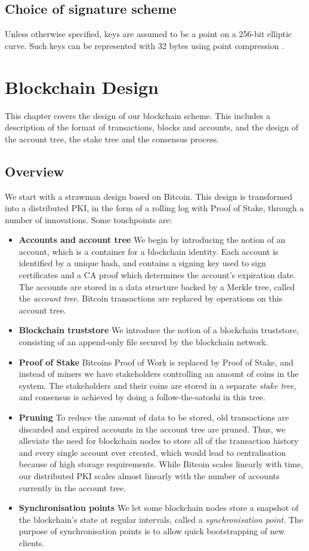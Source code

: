 \documentclass{style/kththesis}
\begin{document}
\section{Choice of signature scheme}
Unless otherwise specified, keys are assumed to be a point on a 256-bit elliptic curve. Such keys can be represented with 32 bytes using point compression \cite{Jivsov14}.

\chapter{Blockchain Design}
\label{chap:blockchain}
This chapter covers the design of our blockchain scheme. This includes a description of the format of transactions, blocks and accounts, and the design of the account tree, the stake tree and the consensus process.

\section{Overview}
We start with a strawman design based on Bitcoin. This design is transformed into a distributed PKI, in the form of a rolling log with Proof of Stake, through a number of innovations. Some touchpoints are:

\begin{itemize}
    \item \textbf{Accounts and account tree} We begin by introducing the notion of an account, which is a container for a blockchain identity. Each account is identified by a unique hash, and contains a signing key used to sign certificates and a CA proof which determines the account's expiration date. The accounts are stored in a data structure backed by a Merkle tree, called the \emph{account tree}. Bitcoin transactions are replaced by operations on this account tree.
    \item \textbf{Blockchain truststore} We introduce the notion of a blockchain truststore, consisting of an append-only file secured by the blockchain network.
    \item \textbf{Proof of Stake} Bitcoins Proof of Work is replaced by Proof of Stake, and instead of miners we have stakeholders controlling an amount of coins in the system. The stakeholders and their coins are stored in a separate \emph{stake tree}, and consensus is achieved by doing a follow-the-satoshi in this tree.
    \item \textbf{Pruning} To reduce the amount of data to be stored, old transactions are discarded and expired accounts in the account tree are pruned. Thus, we alleviate the need for blockchain nodes to store all of the transaction history and every single account ever created, which would lead to centralisation because of high storage requirements. While Bitcoin scales linearly with time, our distributed PKI scales almost linearly with the number of accounts currently in the account tree.
    \item \textbf{Synchronisation points} We let some blockchain nodes store a snapshot of the blockchain's state at regular intervals, called a \emph{synchronisation point}. The purpose of synchronisation points is to allow quick bootstrapping of new clients.
\end{itemize}
\end{document}
